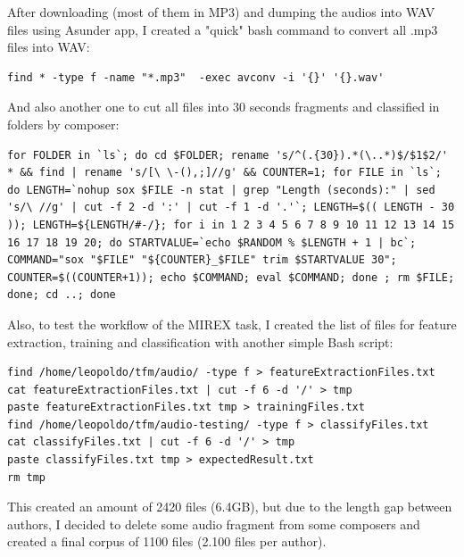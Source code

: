 \documentclass[a4paper,openany,oneside,12pt]{book}
\begin{document}
After downloading (most of them in MP3) and dumping the audios into WAV files using Asunder app, I created a "quick" bash command to convert all .mp3 files into WAV:
\lstset{language=Bash,
           basicstyle=\ttfamily\scriptsize,
           keywordstyle=\ttfamily,
           stringstyle=\ttfamily,
           commentstyle=\ttfamily,
          breaklines=true
          }
\begin{lstlisting}
find * -type f -name "*.mp3"  -exec avconv -i '{}' '{}.wav'
\end{lstlisting}

And also another one to cut all files into 30 seconds fragments and classified in folders by composer:
\lstset{language=Bash,
           basicstyle=\ttfamily\scriptsize,
           keywordstyle=\ttfamily,
           stringstyle=\ttfamily,
           commentstyle=\ttfamily,
          breaklines=true
          }
\begin{lstlisting}
for FOLDER in `ls`; do cd $FOLDER; rename 's/^(.{30}).*(\..*)$/$1$2/' * && find | rename 's/[\ \-(),;]//g' && COUNTER=1; for FILE in `ls`; do LENGTH=`nohup sox $FILE -n stat | grep "Length (seconds):" | sed 's/\ //g' | cut -f 2 -d ':' | cut -f 1 -d '.'`; LENGTH=$(( LENGTH - 30 )); LENGTH=${LENGTH/#-/}; for i in 1 2 3 4 5 6 7 8 9 10 11 12 13 14 15 16 17 18 19 20; do STARTVALUE=`echo $RANDOM % $LENGTH + 1 | bc`; COMMAND="sox "$FILE" "${COUNTER}_$FILE" trim $STARTVALUE 30"; COUNTER=$((COUNTER+1)); echo $COMMAND; eval $COMMAND; done ; rm $FILE; done; cd ..; done
\end{lstlisting}

Also, to test the workflow of the MIREX task, I created the list of files for feature extraction, training and classification with another simple Bash script:

\lstset{language=Bash,
           basicstyle=\ttfamily\scriptsize,
           keywordstyle=\ttfamily,
           stringstyle=\ttfamily,
           commentstyle=\ttfamily,
          breaklines=true
          }
\begin{lstlisting}
find /home/leopoldo/tfm/audio/ -type f > featureExtractionFiles.txt
cat featureExtractionFiles.txt | cut -f 6 -d '/' > tmp
paste featureExtractionFiles.txt tmp > trainingFiles.txt
find /home/leopoldo/tfm/audio-testing/ -type f > classifyFiles.txt
cat classifyFiles.txt | cut -f 6 -d '/' > tmp
paste classifyFiles.txt tmp > expectedResult.txt
rm tmp
\end{lstlisting}


This created an amount of 2420 files (6.4GB), but due to the length gap between authors, I decided to delete some audio fragment from some composers and created a final corpus of 1100 files (2.100 files per author).
\end{document}
